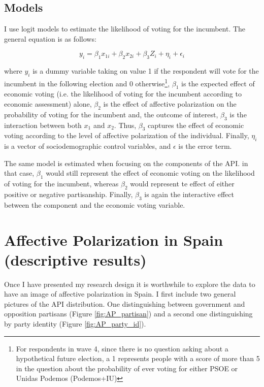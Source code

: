 \documentclass[a4paper, svgnames]{article}
\begin{document}
\subsection{Models}

I use logit models to estimate the likelihood of voting for the incumbent. The general equation is as follows:

\begin{equation}
	\label{model}
	y_i = \beta_1 x_{1i} + \beta_2 x_{2i} + \beta_3 Z_i  + \eta_i  + \epsilon_i
\end{equation}

where $y_i$ is a dummy variable taking on value 1 if the respondent will vote for the incumbent in the following election and 0 otherwise\footnote{For respondents in wave 4, since there is no question asking about a hypothetical future election, a 1 represents people with a score of more than 5 in the question about the probability of ever voting for either PSOE or Unidas Podemos (Podemos+IU)}, $\beta_1$ is the expected effect of economic voting (i.e. the likelihood of voting for the incumbent according to economic assessment) alone, $\beta_2$ is the effect of affective polarization on the probability of voting for the incumbent and, the outcome of interest, $\beta_3$ is the interaction between both $x_1$ and $x_2$. Thus, $\beta_3$ captures the effect of economic voting according to the level of affective polarization of the individual. Finally, $\eta_i$ is a vector of sociodemographic control variables, and $\epsilon$ is the error term.

The same model is estimated when focusing on the components of the API. in that case, $\beta_1$ would still represent the effect of economic voting on the likelihood of voting for the incumbent, whereas $\beta_2$ would represent te effect of either positive or negative partisanship. Finally, $\beta_3$ is again the interactive effect between the component and the economic voting variable.

\newpage
\section{Affective Polarization in Spain (descriptive results)}

Once I have presented my research design it is worthwhile to explore the data to have an image of affective polarization in Spain. I first include two general pictures of the API distribution. One distinguishing between government and opposition partisans (Figure \ref{fig:AP_partisan}) and a second one distinguishing by party identity (Figure \ref{fig:AP_party_id}).
\end{document}
